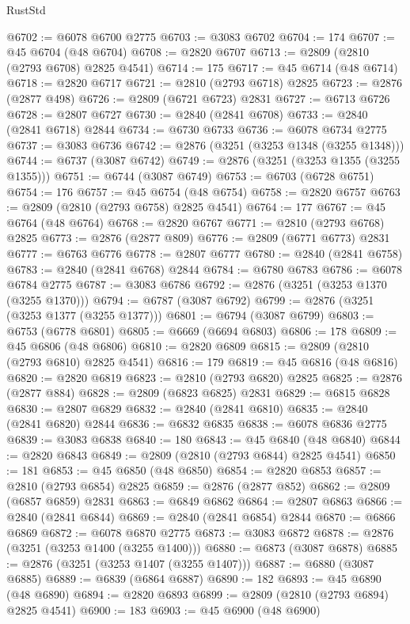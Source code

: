 \begin{lexlean}{RustStd}
\begin{coremodule}
@6702 := @6078 @6700 @2775
@6703 := @3083 @6702
@6704 := 174
@6707 := @45 @6704 (@48 @6704)
@6708 := @2820 @6707
@6713 := @2809 (@2810 (@2793 @6708) @2825 @4541)
@6714 := 175
@6717 := @45 @6714 (@48 @6714)
@6718 := @2820 @6717
@6721 := @2810 (@2793 @6718) @2825
@6723 := @2876 (@2877 @498)
@6726 := @2809 (@6721 @6723) @2831
@6727 := @6713 @6726
@6728 := @2807 @6727
@6730 := @2840 (@2841 @6708)
@6733 := @2840 (@2841 @6718) @2844
@6734 := @6730 @6733
@6736 := @6078 @6734 @2775
@6737 := @3083 @6736
@6742 := @2876 (@3251 (@3253 @1348 (@3255 @1348)))
@6744 := @6737 (@3087 @6742)
@6749 := @2876 (@3251 (@3253 @1355 (@3255 @1355)))
@6751 := @6744 (@3087 @6749)
@6753 := @6703 (@6728 @6751)
@6754 := 176
@6757 := @45 @6754 (@48 @6754)
@6758 := @2820 @6757
@6763 := @2809 (@2810 (@2793 @6758) @2825 @4541)
@6764 := 177
@6767 := @45 @6764 (@48 @6764)
@6768 := @2820 @6767
@6771 := @2810 (@2793 @6768) @2825
@6773 := @2876 (@2877 @809)
@6776 := @2809 (@6771 @6773) @2831
@6777 := @6763 @6776
@6778 := @2807 @6777
@6780 := @2840 (@2841 @6758)
@6783 := @2840 (@2841 @6768) @2844
@6784 := @6780 @6783
@6786 := @6078 @6784 @2775
@6787 := @3083 @6786
@6792 := @2876 (@3251 (@3253 @1370 (@3255 @1370)))
@6794 := @6787 (@3087 @6792)
@6799 := @2876 (@3251 (@3253 @1377 (@3255 @1377)))
@6801 := @6794 (@3087 @6799)
@6803 := @6753 (@6778 @6801)
@6805 := @6669 (@6694 @6803)
@6806 := 178
@6809 := @45 @6806 (@48 @6806)
@6810 := @2820 @6809
@6815 := @2809 (@2810 (@2793 @6810) @2825 @4541)
@6816 := 179
@6819 := @45 @6816 (@48 @6816)
@6820 := @2820 @6819
@6823 := @2810 (@2793 @6820) @2825
@6825 := @2876 (@2877 @884)
@6828 := @2809 (@6823 @6825) @2831
@6829 := @6815 @6828
@6830 := @2807 @6829
@6832 := @2840 (@2841 @6810)
@6835 := @2840 (@2841 @6820) @2844
@6836 := @6832 @6835
@6838 := @6078 @6836 @2775
@6839 := @3083 @6838
@6840 := 180
@6843 := @45 @6840 (@48 @6840)
@6844 := @2820 @6843
@6849 := @2809 (@2810 (@2793 @6844) @2825 @4541)
@6850 := 181
@6853 := @45 @6850 (@48 @6850)
@6854 := @2820 @6853
@6857 := @2810 (@2793 @6854) @2825
@6859 := @2876 (@2877 @852)
@6862 := @2809 (@6857 @6859) @2831
@6863 := @6849 @6862
@6864 := @2807 @6863
@6866 := @2840 (@2841 @6844)
@6869 := @2840 (@2841 @6854) @2844
@6870 := @6866 @6869
@6872 := @6078 @6870 @2775
@6873 := @3083 @6872
@6878 := @2876 (@3251 (@3253 @1400 (@3255 @1400)))
@6880 := @6873 (@3087 @6878)
@6885 := @2876 (@3251 (@3253 @1407 (@3255 @1407)))
@6887 := @6880 (@3087 @6885)
@6889 := @6839 (@6864 @6887)
@6890 := 182
@6893 := @45 @6890 (@48 @6890)
@6894 := @2820 @6893
@6899 := @2809 (@2810 (@2793 @6894) @2825 @4541)
@6900 := 183
@6903 := @45 @6900 (@48 @6900)

\end{coremodule}
\end{lexlean}
